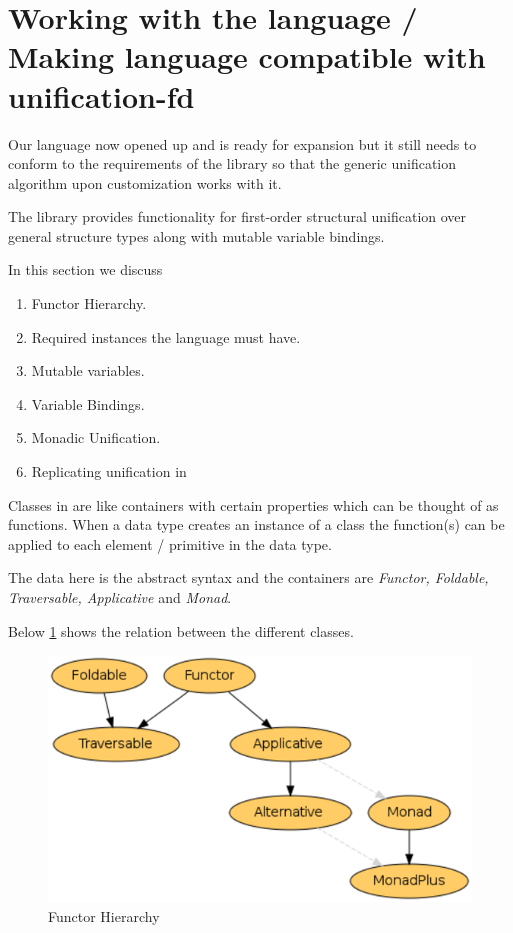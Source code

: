 \documentclass[thesis-solanki.tex]{subfiles}
\begin{document}
\section{Working with the language / Making language compatible with unification-fd}

Our language now opened up and is ready for expansion but it still needs to conform to the requirements of the \cite{unification-fd-lib} 
library so that the generic unification algorithm upon customization works with it.

The library provides functionality for first-order structural unification over general structure types along with mutable variable 
bindings.

In this section we discuss
\begin{enumerate}
\item Functor Hierarchy.

\item Required instances the language must have.

\item Mutable variables.

\item Variable Bindings.
 
\item Monadic Unification.

\item Replicating  unification in  
\end{enumerate}

Classes in  are like containers with certain properties which can be thought of as functions. When a data type creates an
instance of a class the function(s) can be applied to each element / primitive in the data type.    


The data here is the  abstract syntax and the containers are \textit{Functor, Foldable, Traversable, Applicative} 
and \textit{Monad}.     

\clearpage

Below \ref{fig:Functor Hierarchy} shows the relation between the different classes.

\begin{figure}[th]
\centering
\includegraphics[scale = 0.7]{FunctorHierarchy.png}
\caption{Functor Hierarchy \cite{website:foldablenadtraversable}}
\label{fig:Functor Hierarchy}
\end{figure}  
\end{document}
